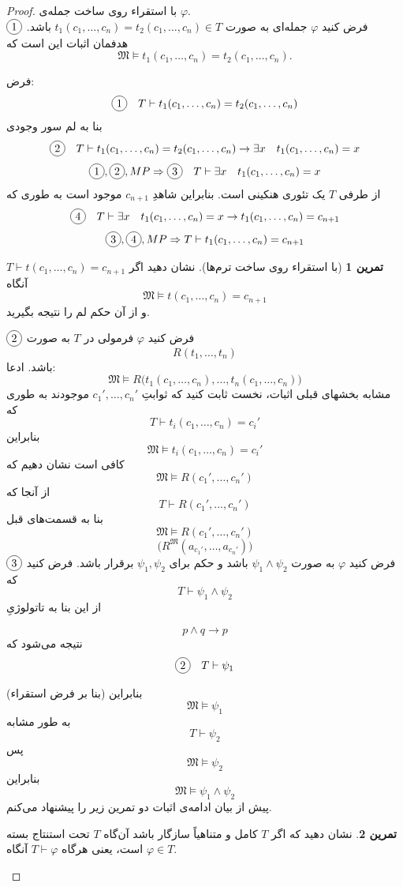 \documentclass[12pt,a4paper]{article}
\theoremstyle{definition}
\newtheorem{tamrin}{تمرین}
\newcommand*\circled[1]{\tikz[baseline=(char.base)]{
		\node[shape=circle,draw,inner sep=2pt] (char) {#1};}}
\begin{document}
	\begin{proof}
		با استقراء روی ساخت جمله‌ی 
		$ \varphi $.
		\\
		$ \circled{1} $
		فرض کنید 
		$ \varphi $
		جمله‌ای به صورت 
		$ t_1(c_1,\ldots,c_n)=t_2(c_1,\ldots,c_n)\in T $
		باشد.  هدفمان اثبات این است که 
		\[ \mathfrak{M}\models t_1(c_1,\ldots,c_n)=t_2(c_1,\ldots,c_n). \]
		\newline

		فرض: 
		\[ \circled{1}\quad T\vdash t_1(c_1,\ldots,c_n)=t_2(c_1,\ldots,c_n) \]
		بنا به لم سور وجودی 
		\[ \circled{2}\quad T\vdash t_1(c_1,\ldots,c_n)=t_2(c_1,\ldots,c_n) \to \exists x \quad t_1(c_1,\ldots,c_n)=x \]
		\[ \circled{1},\circled{2},MP \Rightarrow \circled{3} \quad T\vdash\exists x \quad t_1(c_1,\ldots,c_n)=x  \]
		از طرفی 
		$ T $
		یک تئوری هنکینی است. بنابراین شاهدِ 
		$ c_{n+1} $
		موجود است به طوری که
		\[ \circled{4} \quad T\vdash \exists x \quad t_1(c_1,\ldots,c_n)=x \to t_1(c_1,\ldots,c_n)=c_{n+1} \]
		\[ \circled{3},\circled{4},MP \Rightarrow T\vdash t_1(c_1,\ldots,c_n)=c_{n+1} \]
		\begin{tamrin}[با استقراء روی ساخت ترم‌ها]
			نشان دهید اگر 
			$ T\vdash t(c_1,\ldots,c_n)=c_{n+1} $
			آنگاه 
			\[ \mathfrak{M}\models t(c_1,\ldots,c_n)=c_{n+1} \]
			و از آن حکم لم را نتیجه بگیرید.
		\end{tamrin}

		$ \circled{2} $
		فرض کنید 
		$ \varphi $
		فرمولی در 
		$T$ 
		به صورت 
		\[ R(t_1,\ldots,t_n)\]
		باشد. ادعا:
		\[ \mathfrak{M}\models R\Big( t_1(c_1,\ldots,c_n),\ldots,t_n(c_1,\ldots,c_n) \Big) \]
مشابه بخشهای قبلی اثبات،		نخست ثابت کنید که ثوابتِ 
		$ c_1',\ldots,c_n' $
		موجودند به طوری که 
		\[ T\vdash t_i(c_1,\ldots,c_n)=c_i' \]
		بنابراین 
		\[ \mathfrak{M}\models t_i(c_1,\ldots,c_n)=c_i' \]
		کافی است نشان دهیم که 
		\[ \mathfrak{M}\models R(c_1',\ldots,c_n') \]
		از آنجا که 
		\[ T\vdash R(c_1',\ldots,c_n') \]
		بنا به قسمت‌های قبل 
		\[ \mathfrak{M}\models R(c_1',\ldots,c_n')  \]
		\[ \Big( R^\mathfrak{M} (a_{c_1'},\ldots,a_{c_n'}) \Big) \]
		$ \circled{3} $
		فرض کنید 
		$ \varphi $
		به صورت 
		$ \psi_1 \wedge \psi_2 $
		باشد و حکم برای 
		$ \psi_1,\psi_2 $
		برقرار باشد. فرض کنید که
		\[ T\vdash \psi_1 \wedge \psi_2 \]
	از این 
	بنا به تاتولوژیِ
	
		\[ p\wedge q \to p \]
	نتیجه می‌شود که 
		\begin{align*}
		\circled{2}\quad T\vdash \psi_1
		\end{align*}

		بنابراین (بنا بر فرض استقراء) 
		\[ \mathfrak{M} \models \psi_1 \]
		به طور مشابه 
		\[ T \vdash \psi_2 \]
		پس
		\[ \mathfrak{M} \models \psi_2 \]
		بنابراین 
		\[ \mathfrak{M} \models \psi_1\wedge\psi_2 \]
پیش از بیان ادامه‌ی اثبات دو تمرین زیر را پیشنهاد می‌کنم.
		\begin{tamrin}
	نشان دهید که
			اگر 
			$ T $
			کامل و متناهیاً سازگار باشد آن‌گاه 
			$ T $
			تحت استنتاج بسته است، یعنی هرگاه
			$ T \vdash \varphi $
آنگاه
			$ \varphi\in T $.
		\end{tamrin}


\end{proof}
\end{document}

